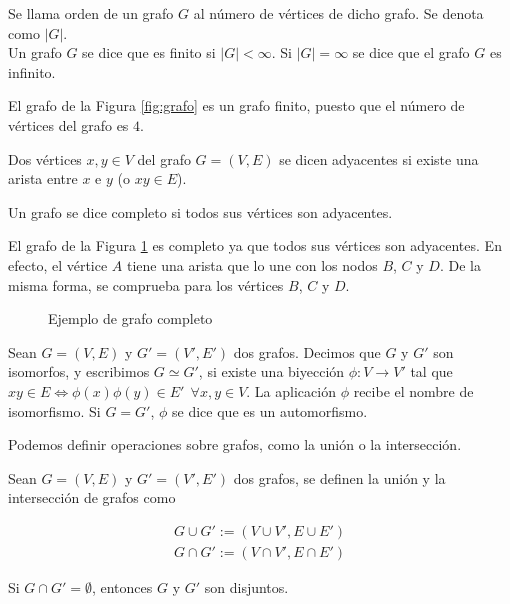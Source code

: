 \begin{defi}
	Se llama orden de un grafo $G$ al número de vértices de dicho grafo. Se denota como $|G|$.\\
	Un grafo $G$ se dice que es finito si $|G| < \infty$. Si $|G| = \infty$ se dice que el grafo $G$ es infinito.
\end{defi}

\begin{ejemplo}
	El grafo de la Figura \ref{fig:grafo} es un grafo finito, puesto que el número de vértices del grafo es $4$.
\end{ejemplo}

\begin{defi}
	Dos vértices $x,y \in V$ del grafo $G = (V,E)$ se dicen adyacentes si existe una arista entre $x$ e $y$ (o $xy \in E$).
\end{defi}

\begin{defi}
	Un grafo se dice completo si todos sus vértices son adyacentes.
\end{defi}

\begin{ejemplo}
	El grafo de la Figura \ref{fig:grafo_completo} es completo ya que todos sus vértices son adyacentes. En efecto, el vértice $A$ tiene una arista que lo une con los nodos $B$, $C$ y $D$. De la misma forma, se comprueba para los vértices $B$, $C$ y $D$.
	
	\begin{figure}[htb]
		\centering
		\ejemplografocompleto
		\caption{Ejemplo de grafo completo}
		\label{fig:grafo_completo}
	\end{figure}
	
\end{ejemplo}

\begin{defi}
	Sean $G = (V,E)$ y $G' = (V',E')$ dos grafos. Decimos que $G$ y $G'$ son isomorfos, y escribimos $G \simeq G'$, si existe una biyección $\phi : V \to V'$ tal que $xy \in E \iff \phi(x)\phi(y) \in E' \ \ \forall x,y \in V$. La aplicación $\phi$ recibe el nombre de isomorfismo. Si $G = G'$, $\phi$ se dice que es un automorfismo. 
\end{defi}

Podemos definir operaciones sobre grafos, como la unión o la intersección.

\begin{defi}
	Sean $G = (V,E)$ y $G' = (V',E')$ dos grafos, se definen la unión y la intersección de grafos como
	
	\begin{eqnarray*}
		G \cup G' := (V \cup V', E \cup E')\\
		G \cap G' := (V \cap V', E \cap E')
	\end{eqnarray*}
	
	Si $G \cap G' = \emptyset$, entonces $G$ y $G'$ son disjuntos.
\end{defi}

